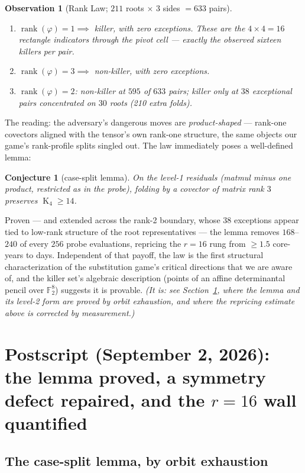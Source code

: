 \documentclass[11pt]{article}
\newtheorem{conjecture}{Conjecture}
\newtheorem{observation}{Observation}
\theoremstyle{definition}
\newcommand{\F}{\mathbb{F}_2}
\newcommand{\rk}{\operatorname{rank}}
\newcommand{\kos}{\operatorname{K}}
\begin{document}
\begin{observation}[Rank Law; $211$ roots $\times$ $3$ sides $=633$ pairs]
\leavevmode
\begin{enumerate}
\item $\rk(\varphi) = 1 \implies$ killer, with zero exceptions. These are
the $4\times 4 = 16$ rectangle indicators through the pivot cell ---
exactly the observed sixteen killers per pair.
\item $\rk(\varphi) = 3 \implies$ non-killer, with zero exceptions.
\item $\rk(\varphi) = 2$: non-killer at $595$ of $633$ pairs; killer only
at $38$ exceptional pairs concentrated on $30$ roots (210 extra folds).
\end{enumerate}
\end{observation}

The reading: the adversary's dangerous moves are \emph{product-shaped} ---
rank-one covectors aligned with the tensor's own rank-one structure, the
same objects our game's rank-profile splits singled out. The law
immediately poses a well-defined lemma:

\begin{conjecture}[case-split lemma]
On the level-1 residuals (matmul minus one product, restricted as in the
probe), folding by a covector of matrix rank $3$ preserves
$\kos_4 \ge 14$.
\end{conjecture}

Proven --- and extended across the rank-2 boundary, whose 38 exceptions
appear tied to low-rank structure of the root representatives --- the
lemma removes $168$--$240$ of every $256$ probe evaluations, repricing the
$r=16$ rung from $\ge 1.5$ core-years to days. Independent of that
payoff, the law is the first structural characterization of the
substitution game's critical directions that we are aware of, and the
killer set's algebraic description (points of an affine determinantal
pencil over $\F^8$) suggests it is provable. \emph{(It is: see
Section~\ref{sec:postscript}, where the lemma and its level-2 form are
proved by orbit exhaustion, and where the repricing estimate above is
corrected by measurement.)}


\section{Postscript (September 2, 2026): the lemma proved, a symmetry
defect repaired, and the $r=16$ wall quantified}
\label{sec:postscript}

\subsection{The case-split lemma, by orbit exhaustion}
\end{document}
